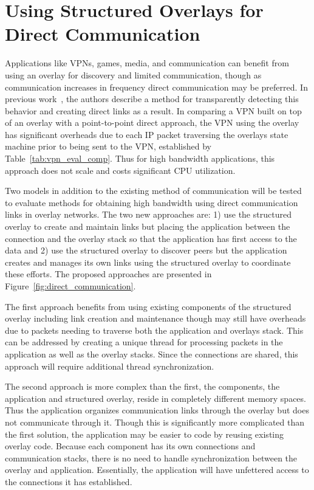 \section{Using Structured Overlays for Direct Communication}
\label{direct_communication}
Applications like VPNs, games, media, and communication can benefit from using
an overlay for discovery and limited communication, though as communication
increases in frequency direct communication may be preferred.  In previous
work~\cite{wow}, the authors describe a method for transparently detecting this
behavior and creating direct links as a result.  In comparing a VPN built on
top of an overlay with a point-to-point direct approach, the VPN using the
overlay has significant overheads due to each IP packet traversing the overlays
state machine prior to being sent to the VPN, established by
Table~\ref{tab:vpn_eval_comp}.  Thus for high bandwidth applications, this
approach does not scale and costs significant CPU utilization.

Two models in addition to the existing method of communication will be tested
to evaluate methods for obtaining high bandwidth using direct communication
links in overlay networks.  The two new approaches are:  1) use the structured
overlay to create and maintain links but placing the application between the
connection and the overlay stack so that the application has first access to
the data and 2) use the structured overlay to discover peers but the
application creates and manages its own links using the structured overlay to
coordinate these efforts.  The proposed approaches are presented in
Figure~\ref{fig:direct_communication}.

The first approach benefits from using existing components of the structured
overlay including link creation and maintenance though may still have overheads
due to packets needing to traverse both the application and overlays stack.
This can be addressed by creating a unique thread for processing packets in the
application as well as the overlay stacks.  Since the connections are shared,
this approach will require additional thread synchronization.

The second approach is more complex than the first, the components, the
application and structured overlay, reside in completely different memory
spaces.  Thus the application organizes communication links through the overlay
but does not communicate through it.  Though this is significantly more
complicated than the first solution, the application may be easier to code by
reusing existing overlay code.  Because each component has its own connections
and communication stacks, there is no need to handle synchronization between
the overlay and application.  Essentially, the application will have unfettered
access to the connections it has established.

